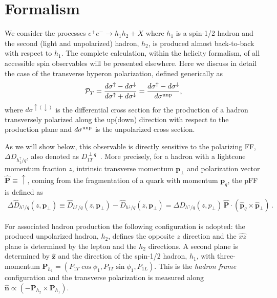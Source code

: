 \documentclass[submission, Proceedings]{SciPost}
\newcommand{\bea}{\begin{eqnarray}}
\newcommand{\eea}{\end{eqnarray}}
\begin{document}
\section{Formalism}
We consider the processes $e^+e^-\to h_1 h_2 + X$ where $h_1$ is a spin-1/2 hadron and the second (light and unpolarized) hadron, $h_2$, is produced almost back-to-back with respect to $h_1$. The complete calculation, within the helicity formalism, of all accessible spin observables will be presented elsewhere. Here we discuss in detail the case of the transverse hyperon polarization, defined generically as
\begin{equation}
{\cal P}_T = \frac{d\sigma^{\uparrow} - d\sigma^{\downarrow} }{d\sigma^{\uparrow} + d\sigma^{\downarrow}} = \frac{d\sigma^{\uparrow} - d\sigma^{\downarrow} }{d\sigma^{\rm unp}} ,
\label{polt}
\end{equation}
where $d\sigma^{\uparrow(\downarrow)}$ is the differential cross section for the production of a hadron transversely polarized along the up(down) direction with respect to the production plane and $d\sigma^{\rm unp}$ is the unpolarized cross section.

As we will show below, this observable is directly sensitive to the polarizing FF, $\Delta D_{h_1^\uparrow\!/q}$, also denoted as $D_{1T}^{\perp q}$~\cite{Bacchetta:2004jz}. More precisely, for a hadron with a lightcone momentum fraction $z$, intrinsic transverse momentum $\bm{p}_\perp$ and polarization vector $\hat{\bm{P}}\equiv \uparrow$, coming from the fragmentation of a quark with momentum $\bm{p}_q$, the pFF is defined as
\bea
\label{polFF}
\Delta \hat D_{h^\uparrow\!/q}(z,\bm{p}_{\perp}) \equiv \hat D_{h^\uparrow\!/q}(z,\bm{p}_\perp) - \hat D_{h^\downarrow\!/q}(z,\bm{p}_\perp) = \Delta D_{h^\uparrow\!/q}(z,p_{\perp}) \,\hat{\bm{P}} \cdot (\hat{\bm{p}}_q \times \hat{\bm{p}}_\perp) \,.
\eea

For associated hadron production the following configuration is adopted: the produced unpolarized hadron, $h_2$, defines the opposite $z$ direction %
and the $\widehat{xz}$ plane is determined by the lepton and the $h_2$ directions. %
A second plane is determined by $\hat{\bm z}$ and the direction of the spin-1/2 hadron, $h_1$, with three-momentum $\bm{P}_{h_1}= (P_{1T} \cos\phi_1,P_{1T}\sin\phi_1,P_{1L})$.
This is the \emph{hadron frame} configuration and the transverse polarization is measured along $\hat{\bm{n}} \propto (-\bm{P}_{h_2}\times \bm{P}_{h_1})$.
\end{document}
